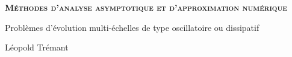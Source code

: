 \documentclass{these-dbl}
\begin{document}



\clearemptydoublepage

\begin{titlepage}
    \begin{center}
        \selectfont
       \Large\textbf{\textsc{
           M\'ethodes d'analyse asymptotique et d'approximation num\'erique
       }}

       \bigskip
       \large
       Problèmes d'évolution multi-\'echelles de type oscillatoire ou dissipatif

       \begin{minipage}{.5\textwidth}
        \bigskip\bigskip
        \hrulefill
        \bigskip\bigskip
       \end{minipage}

       \normalsize
       Léopold Trémant
    \end{center}
 \end{titlepage}

\clearemptydoublepage


\frontmatter
\clearemptydoublepage
\renewcommand{\contentsname}{Table des matières}
\tableofcontents %

\clearemptydoublepage


\renewcommand{\theequation}{\thesection.\arabic{equation}}

\renewcommand*{\proofname}{Proof}
\end{document}
